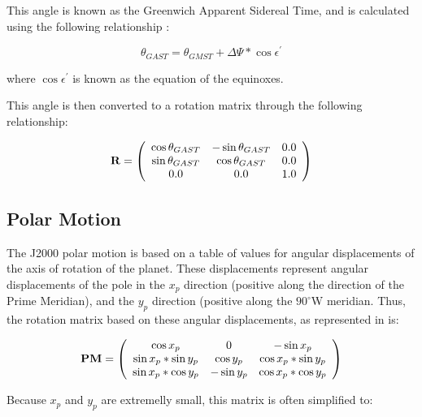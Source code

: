 This angle is known as the Greenwich Apparent Sidereal Time, and is
calculated using the following relationship \cite{ValladoThird}:

\begin{equation} \label{GAST_formula}
\theta_{GAST} = \theta_{GMST} + \Delta\Psi * \cos \epsilon^{\prime}
\end{equation}

where $\cos \epsilon^{\prime}$ is known as the equation of the equinoxes.

This angle is then converted to a rotation matrix through the following
relationship:

\begin{equation}\label{rotation_matrix}
{\bf R} =
\left( \begin{array} {ccc}

\cos \theta_{GAST}
& -\sin \theta_{GAST}
& 0.0 \\

\sin \theta_{GAST}
& \cos \theta_{GAST}
& 0.0 \\

0.0
& 0.0
& 1.0

\end{array} \right)
\end{equation}

\subsection{Polar Motion}

The J2000 polar motion is based on a table of values for angular displacements of
the axis of rotation of the planet. These displacements represent angular
displacements of the pole in the $x_p$ direction (positive along the direction
of the Prime Meridian), and the $y_p$ 
direction (positive along the $90^{\circ}$W
meridian. Thus, the rotation matrix based on these angular displacements,
as represented in \cite{ValladoThird} is:


\begin{equation}\label{true_polar_motion_rot}
{\bf PM} = 
 \left( \begin{array} {ccc}
\cos x_p            & 0         & -\sin x_p \\
\sin x_p * \sin y_p & \cos y_p  & \cos x_p * \sin y_p  \\
\sin x_p * \cos y_p & -\sin y_p & \cos x_p * \cos y_p \end{array} \right) 
\end{equation}

Because $x_p$ and $y_p$ are extremelly small, this matrix is often simplified to:

